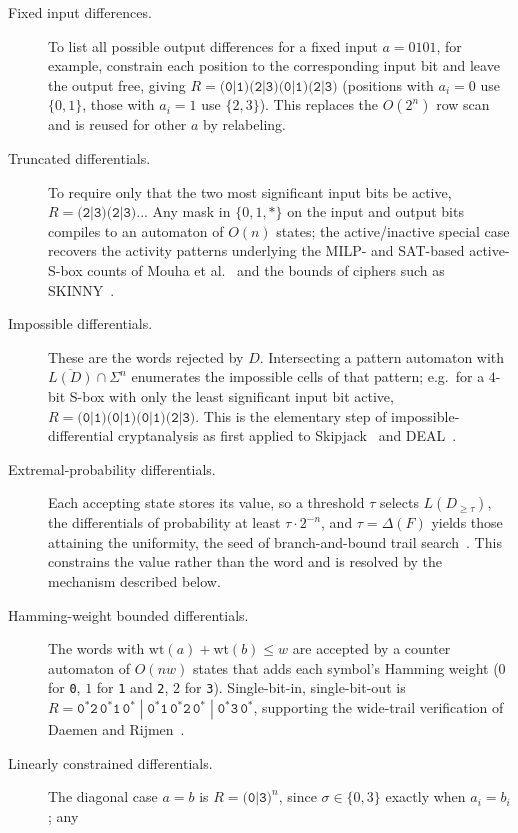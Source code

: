 \documentclass[runningheads]{llncs}
\newcommand{\Sig}{\Sigma}
\newcommand{\re}[1]{\texttt{#1}}
\newcommand{\wt}{\mathrm{wt}}
\begin{document}
\begin{description}
\item[Fixed input differences.] To list all possible output differences for a
  fixed input $a=0101$, for example, constrain each position to the corresponding input bit and
  leave the output free, giving $R=\re{(0|1)(2|3)(0|1)(2|3)}$ (positions with
  $a_i=0$ use $\{0,1\}$, those with $a_i=1$ use $\{2,3\}$). This replaces the
  $O(2^{n})$ row scan and is reused for other $a$ by relabeling.
\item[Truncated differentials.] To require only that the two most significant
  input bits be active, $R=\re{(2|3)(2|3)..}$. Any mask in $\{0,1,*\}$ on the
  input and output bits compiles to an automaton of $O(n)$ states; the
  active/inactive special case recovers the activity patterns underlying the
  MILP- and SAT-based active-S-box counts of Mouha et al.~\cite{MouhaEtAl2012} and the
  bounds of ciphers such as SKINNY~\cite{BeierleEtAl2016}.
\item[Impossible differentials.] These are the words rejected by $D$. Intersecting
  a pattern automaton with $\overline{L(D)}\cap\Sig^{n}$ enumerates the impossible
  cells of that pattern; e.g.\ for a $4$-bit S-box with only the least significant
  input bit active, $R=\re{(0|1)(0|1)(0|1)(2|3)}$. This is the elementary step of
  impossible-differential cryptanalysis as first applied to
      Skipjack~\cite{BihamEtAl1999} and DEAL~\cite{Knudsen1998}.
\item[Extremal-probability differentials.] Each accepting state stores its value,
  so a threshold $\tau$ selects $L(D_{\ge\tau})$, the differentials of probability
  at least $\tau\cdot 2^{-n}$, and $\tau=\Delta(F)$ yields
  those attaining the uniformity, the seed of branch-and-bound trail
  search~\cite{Matsui1995}. This constrains the value rather than the word and is
  resolved by the mechanism described below.
\item[Hamming-weight bounded differentials.] The words with $\wt(a)+\wt(b)\le w$
  are accepted by a counter automaton of $O(nw)$ states that adds each symbol's
  Hamming weight ($0$ for \re{0}, $1$ for \re{1} and \re{2}, $2$ for \re{3}).
  Single-bit-in, single-bit-out is
  $R=\re{0}^{*}\re{2}\,\re{0}^{*}\re{1}\,\re{0}^{*}\;|\;\re{0}^{*}\re{1}\,\re{0}^{*}\re{2}\,\re{0}^{*}\;|\;\re{0}^{*}\re{3}\,\re{0}^{*}$,
  supporting the wide-trail
  verification of Daemen and Rijmen~\cite{DaemenAndRijmen2020}.
\item[Linearly constrained differentials.] The diagonal case $a=b$ is
  $R=\re{(0|3)}^{n}$, since $\sigma\in\{0,3\}$ exactly when $a_i=b_i$; any

\end{description}
\end{document}
